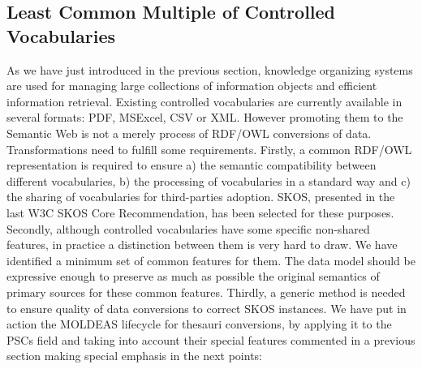 \subsection{Least Common Multiple of Controlled Vocabularies}
As we have just introduced in the previous section, knowledge organizing systems are used for managing large collections of 
information objects and efficient information retrieval. Existing controlled vocabularies are currently available in several 
formats: PDF, MSExcel, CSV or XML. However promoting them to the Semantic Web is not a merely process of 
RDF/OWL conversions of data. Transformations need to fulfill some requirements. Firstly, a common RDF/OWL 
representation is required to ensure a) the semantic compatibility between different vocabularies,
b) the processing of vocabularies in a standard way and c) the sharing of vocabularies for third-parties adoption. 
SKOS, presented in the last W3C SKOS Core Recommendation, has been selected for these purposes. 
Secondly, although controlled vocabularies have some specific non-shared features, in practice a distinction 
between them is very hard to draw. We have identified a minimum set of common features for them. The data model 
should be expressive enough to preserve as much as possible the original semantics of primary sources for these 
common features. Thirdly, a generic method is needed to ensure quality of data conversions to correct SKOS instances. 
We have put in action the MOLDEAS lifecycle for thesauri conversions, by applying it to the PSCs field and taking into 
account their special features commented in a previous section making special emphasis in the next points:

